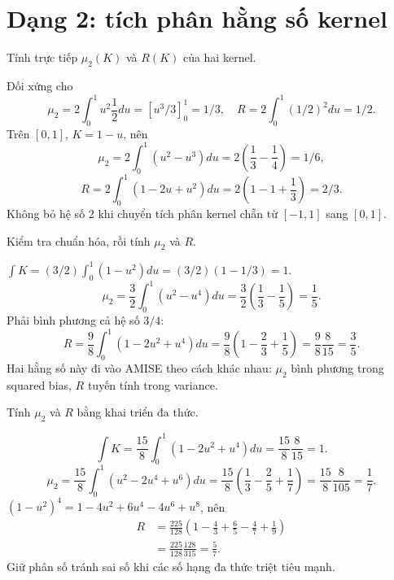 \section{Dạng 2: tích phân hằng số kernel}
\begin{exercise}
Tính trực tiếp $\mu_2(K)$ và $R(K)$ của hai kernel.
\end{exercise}
\begin{solution}
Đối xứng cho
\[
\mu_2=2\int_0^1u^2\frac12du=[u^3/3]_0^1=\boxed{1/3},
\quad
R=2\int_0^1(1/2)^2du=\boxed{1/2}.
\]
Trên $[0,1]$, $K=1-u$, nên
\[
\mu_2=2\int_0^1(u^2-u^3)du
=2\left(\frac13-\frac14\right)=\boxed{1/6},
\]
\[
R=2\int_0^1(1-2u+u^2)du
=2\left(1-1+\frac13\right)=\boxed{2/3}.
\]
Không bỏ hệ số 2 khi chuyển tích phân kernel chẵn từ $[-1,1]$ sang $[0,1]$.
\end{solution}

\begin{exercise}[Epanechnikov]
Kiểm tra chuẩn hóa, rồi tính $\mu_2$ và $R$.
\end{exercise}
\begin{solution}
$\int K=(3/2)\int_0^1(1-u^2)du=(3/2)(1-1/3)=1$.
\[
\mu_2=\frac32\int_0^1(u^2-u^4)du
=\frac32\left(\frac13-\frac15\right)=\boxed{\frac15}.
\]
Phải bình phương cả hệ số $3/4$:
\[
R=\frac98\int_0^1(1-2u^2+u^4)du
=\frac98\left(1-\frac23+\frac15\right)
=\frac98\frac8{15}=\boxed{\frac35}.
\]
Hai hằng số này đi vào AMISE theo cách khác nhau: $\mu_2$ bình phương
trong squared bias, $R$ tuyến tính trong variance.
\end{solution}

\begin{exercise}[Biweight]
Tính $\mu_2$ và $R$ bằng khai triển đa thức.
\end{exercise}
\begin{solution}
\[
\int K=\frac{15}{8}\int_0^1(1-2u^2+u^4)du
=\frac{15}{8}\frac8{15}=1.
\]
\[
\mu_2=\frac{15}{8}\int_0^1(u^2-2u^4+u^6)du
=\frac{15}{8}\left(\frac13-\frac25+\frac17\right)
=\frac{15}{8}\frac8{105}=\boxed{\frac17}.
\]
$(1-u^2)^4=1-4u^2+6u^4-4u^6+u^8$, nên
\begin{align*}
R&=\frac{225}{128}\left(1-\frac43+\frac65-\frac47+\frac19\right)\\
&=\frac{225}{128}\frac{128}{315}=\boxed{\frac57}.
\end{align*}
Giữ phân số tránh sai số khi các số hạng đa thức triệt tiêu mạnh.
\end{solution}

